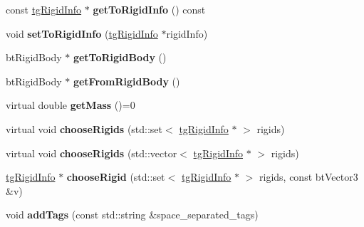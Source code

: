 \begin{DoxyCompactItemize}
\item 
\hypertarget{classtg_connector_info_a90f0e0a9310321830ae3eb698316b92d}{const \hyperlink{classtg_rigid_info}{tg\-Rigid\-Info} $\ast$ {\bfseries get\-To\-Rigid\-Info} () const }\label{classtg_connector_info_a90f0e0a9310321830ae3eb698316b92d}

\item 
\hypertarget{classtg_connector_info_aa0200180014d2e36a2539b9e2b955077}{void {\bfseries set\-To\-Rigid\-Info} (\hyperlink{classtg_rigid_info}{tg\-Rigid\-Info} $\ast$rigid\-Info)}\label{classtg_connector_info_aa0200180014d2e36a2539b9e2b955077}

\item 
\hypertarget{classtg_connector_info_aa7eb43322b60e7e0ee833080e8465098}{bt\-Rigid\-Body $\ast$ {\bfseries get\-To\-Rigid\-Body} ()}\label{classtg_connector_info_aa7eb43322b60e7e0ee833080e8465098}

\item 
\hypertarget{classtg_connector_info_a81ac443e92d4fb486116c37ab75872cd}{bt\-Rigid\-Body $\ast$ {\bfseries get\-From\-Rigid\-Body} ()}\label{classtg_connector_info_a81ac443e92d4fb486116c37ab75872cd}

\item 
\hypertarget{classtg_connector_info_a4cb103ccf3b503187023eb6e23a3e47d}{virtual double {\bfseries get\-Mass} ()=0}\label{classtg_connector_info_a4cb103ccf3b503187023eb6e23a3e47d}

\item 
\hypertarget{classtg_connector_info_a3a0518a4b3be39813a993f366de70fdc}{virtual void {\bfseries choose\-Rigids} (std\-::set$<$ \hyperlink{classtg_rigid_info}{tg\-Rigid\-Info} $\ast$ $>$ rigids)}\label{classtg_connector_info_a3a0518a4b3be39813a993f366de70fdc}

\item 
\hypertarget{classtg_connector_info_a09a229040fac476ae2ad2f6e138aebe9}{virtual void {\bfseries choose\-Rigids} (std\-::vector$<$ \hyperlink{classtg_rigid_info}{tg\-Rigid\-Info} $\ast$ $>$ rigids)}\label{classtg_connector_info_a09a229040fac476ae2ad2f6e138aebe9}

\item 
\hypertarget{classtg_connector_info_a9e311f259b07b3e07d5b82612370212d}{\hyperlink{classtg_rigid_info}{tg\-Rigid\-Info} $\ast$ {\bfseries choose\-Rigid} (std\-::set$<$ \hyperlink{classtg_rigid_info}{tg\-Rigid\-Info} $\ast$ $>$ rigids, const bt\-Vector3 \&v)}\label{classtg_connector_info_a9e311f259b07b3e07d5b82612370212d}

\item 
\hypertarget{classtg_taggable_af0b8f1729653b0b90d2fecbd51163612}{void {\bfseries add\-Tags} (const std\-::string \&space\-\_\-separated\-\_\-tags)}\label{classtg_taggable_af0b8f1729653b0b90d2fecbd51163612}


\end{DoxyCompactItemize}
